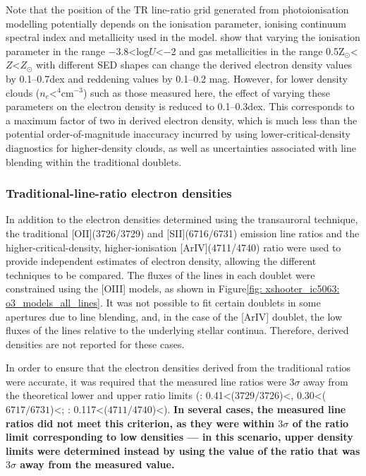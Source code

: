 Note that the position of the TR line-ratio grid generated from photoionisation modelling potentially depends on the ionisation parameter, ionising continuum spectral index and metallicity used in the model. \citet{Santoro2020} show that varying the ionisation parameter in the range \mbox{$-$3.8\;\textless\;log$U$\;\textless\;$-$2} and gas metallicities in the range \mbox{0.5\;Z$_\odot$\;\textless\;$Z$\;\textless{}\;$Z_\odot$} with different SED shapes can change the derived electron density values by 0.1--0.7\;dex and reddening values by 0.1--0.2 mag. However, for lower density clouds ($n_e$\;\mbox{\textless{}$^4$\;cm$^{-3}$}) such as those measured here, the effect of varying these parameters on the electron density is reduced to 0.1--0.3\;dex. This corresponds to a maximum factor of two in derived electron density, which is much less than the potential order-of-magnitude inaccuracy incurred by using lower-critical-density diagnostics for higher-density clouds, as well as uncertainties associated with line blending within the traditional doublets.

\subsubsection{Traditional-line-ratio electron densities}
\label{section: xshooter_ic5063: properties_of_outflowing_gas: uvb_vis_analysis_and_results: trad_densities}

In addition to the electron densities determined using the transauroral technique, the traditional [OII](3726/3729) and [SII](6716/6731) emission line ratios and the higher-critical-density, higher-ionisation [ArIV](4711/4740) ratio were used to provide independent estimates of electron density, allowing the different techniques to be compared. The fluxes of the lines in each doublet were constrained using the [OIII] models, as shown in Figure\;\ref{fig: xshooter_ic5063: o3_models_all_lines}. It was not possible to fit certain doublets in some apertures due to line blending, and, in the case of the [ArIV] doublet, the low fluxes of the lines relative to the underlying stellar continua. Therefore, derived densities are not reported for these cases.

In order to ensure that the electron densities derived from the traditional ratios were accurate, it was required that the measured line ratios were 3$\sigma$ away from the theoretical lower and upper ratio limits (\citealt{Osterbrock2006}: \mbox{0.41\;\textless\;[OII]($3729/3726$)\;\textless{}}, \mbox{0.30\;\textless\;[SII]($6717/6731$)\;\textless{}}; \citealt{Wang2004}: \mbox{0.117\;\textless\;[ArIV]($4711/4740$)\textless{}}). \textbf{In several cases, the measured line ratios did not meet this criterion, as they were within $3\sigma$ of the ratio limit corresponding to low densities --- in this scenario, upper density limits were determined instead by using the value of the ratio that was $3\sigma$ away from the measured value.}

